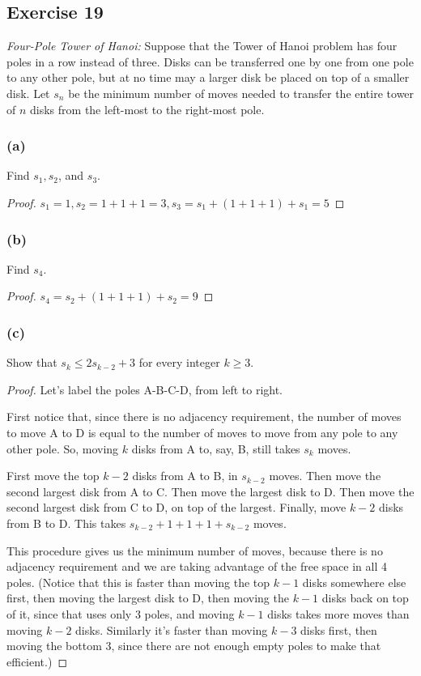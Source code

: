 \documentclass[14pt]{extarticle}
\begin{document}
\subsection{Exercise 19}
{\it Four-Pole Tower of Hanoi:} Suppose that the Tower of Hanoi problem has four poles in a row instead of three. Disks can be transferred one by one from one pole to any other pole, but at no time may a larger disk be placed on top of a smaller disk. Let $s_n$ be the minimum number of moves needed to transfer the entire tower of $n$ disks from the left-most to the right-most pole.

\subsubsection{(a)}
Find $s_1, s_2$, and $s_3$.

\begin{proof}
    $s_1 = 1, s_2 = 1 + 1 + 1 = 3, s_3 = s_1 + (1 + 1 + 1) + s_1 = 5$
\end{proof}

\subsubsection{(b)}
Find $s_4$.

\begin{proof}
    $s_4 = s_2 + (1 + 1 + 1) + s_2 = 9$
\end{proof}

\subsubsection{(c)}
Show that $s_k \leq 2s_{k - 2} + 3$ for every integer $k \geq 3$.

\begin{proof}
    Let's label the poles A-B-C-D, from left to right.

    First notice that, since there is no adjacency requirement, the number of moves to move A to D is equal to the number
    of moves to move from any pole to any other pole. So, moving $k$ disks from A to, say, B, still takes $s_k$ moves.

    First move the top $k-2$ disks from A to B, in $s_{k-2}$ moves. Then move the second largest disk from A to C. Then
    move the largest disk to D. Then move the second largest disk from C to D, on top of the largest. Finally, move
    $k-2$ disks from B to D. This takes $s_{k-2} + 1 + 1 + 1 + s_{k-2}$ moves.

    This procedure gives us the minimum number of moves, because there is no adjacency requirement and we are taking
    advantage of the free space in all 4 poles. (Notice that this is faster than moving the top $k-1$ disks somewhere
    else first, then moving the largest disk to D, then moving the $k-1$ disks back on top of it, since that uses only 3
    poles, and moving $k-1$ disks takes more moves than moving $k-2$ disks. Similarly it's faster than moving $k-3$ disks
    first, then moving the bottom 3, since there are not enough empty poles to make that efficient.)
\end{proof}
\end{document}
